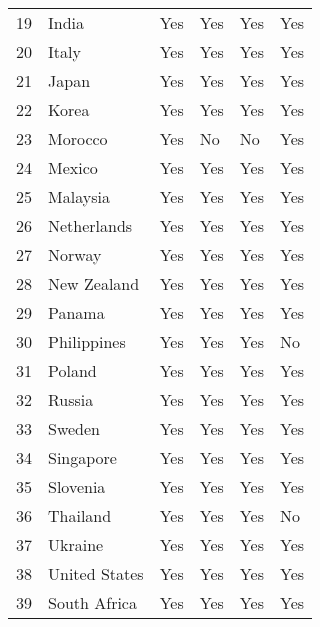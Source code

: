 \begin{tabular}{llllll}
19 &           India &           Yes &          Yes &          Yes &            Yes \\
20 &           Italy &           Yes &          Yes &          Yes &            Yes \\
21 &           Japan &           Yes &          Yes &          Yes &            Yes \\
22 &           Korea &           Yes &          Yes &          Yes &            Yes \\
23 &         Morocco &           Yes &           No &           No &            Yes \\
24 &          Mexico &           Yes &          Yes &          Yes &            Yes \\
25 &        Malaysia &           Yes &          Yes &          Yes &            Yes \\
26 &     Netherlands &           Yes &          Yes &          Yes &            Yes \\
27 &          Norway &           Yes &          Yes &          Yes &            Yes \\
28 &     New Zealand &           Yes &          Yes &          Yes &            Yes \\
29 &          Panama &           Yes &          Yes &          Yes &            Yes \\
30 &     Philippines &           Yes &          Yes &          Yes &             No \\
31 &          Poland &           Yes &          Yes &          Yes &            Yes \\
32 &          Russia &           Yes &          Yes &          Yes &            Yes \\
33 &          Sweden &           Yes &          Yes &          Yes &            Yes \\
34 &       Singapore &           Yes &          Yes &          Yes &            Yes \\
35 &        Slovenia &           Yes &          Yes &          Yes &            Yes \\
36 &        Thailand &           Yes &          Yes &          Yes &             No \\
37 &         Ukraine &           Yes &          Yes &          Yes &            Yes \\
38 &   United States &           Yes &          Yes &          Yes &            Yes \\
39 &    South Africa &           Yes &          Yes &          Yes &            Yes \\
\bottomrule
\end{tabular}
